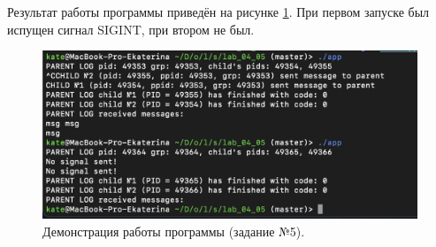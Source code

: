 \documentclass[12pt]{report}
\begin{document}
\newpage
Результат работы программы приведён на рисунке \ref{task05:demo}. При первом запуске был испущен сигнал SIGINT, при втором не был.
\begin{figure}[H]
	\centering
	\includegraphics[width=\linewidth]{task05.png}
	\caption{Демонстрация работы программы (задание №5).}
	\label{task05:demo}
\end{figure}



\end{document}
